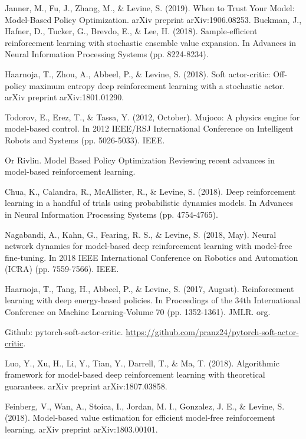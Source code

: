 \newpage
\hypersetup{linkcolor=black,urlcolor=darkgray}
\renewcommand\emph[1]{{\bfseries #1}}
\setlength\bibitemsep{0pt}
\begin{thebibliography}{99}
 Janner, M., Fu, J., Zhang, M., \& Levine, S. (2019). When to Trust Your Model: Model-Based Policy Optimization. arXiv preprint arXiv:1906.08253. 
 Buckman, J., Hafner, D., Tucker, G., Brevdo, E., \& Lee, H. (2018). Sample-efficient reinforcement learning with stochastic ensemble value expansion. In Advances in Neural Information Processing Systems (pp. 8224-8234). 

 Haarnoja, T., Zhou, A., Abbeel, P., \& Levine, S. (2018). Soft actor-critic: Off-policy maximum entropy deep reinforcement learning with a stochastic actor. arXiv preprint arXiv:1801.01290. 

 Todorov, E., Erez, T., \& Tassa, Y. (2012, October). Mujoco: A physics engine for model-based control. In 2012 IEEE/RSJ International Conference on Intelligent Robots and Systems (pp. 5026-5033). IEEE. 

 Or Rivlin. Model Based Policy Optimization {\small Reviewing recent advances in model-based reinforcement learning.}

 Chua, K., Calandra, R., McAllister, R., \& Levine, S. (2018). Deep reinforcement learning in a handful of trials using probabilistic dynamics models. In Advances in Neural Information Processing Systems (pp. 4754-4765).

 Nagabandi, A., Kahn, G., Fearing, R. S., \& Levine, S. (2018, May). Neural network dynamics for model-based deep reinforcement learning with model-free fine-tuning. In 2018 IEEE International Conference on Robotics and Automation (ICRA) (pp. 7559-7566). IEEE.

 Haarnoja, T., Tang, H., Abbeel, P., \& Levine, S. (2017, August). Reinforcement learning with deep energy-based policies. In Proceedings of the 34th International Conference on Machine Learning-Volume 70 (pp. 1352-1361). JMLR. org.

 Github: pytorch-soft-actor-critic. \url{https://github.com/pranz24/pytorch-soft-actor-critic}.

 Luo, Y., Xu, H., Li, Y., Tian, Y., Darrell, T., \& Ma, T. (2018). Algorithmic framework for model-based deep reinforcement learning with theoretical guarantees. arXiv preprint arXiv:1807.03858.

 Feinberg, V., Wan, A., Stoica, I., Jordan, M. I., Gonzalez, J. E., \& Levine, S. (2018). Model-based value estimation for efficient model-free reinforcement learning. arXiv preprint arXiv:1803.00101.
\end{thebibliography}

